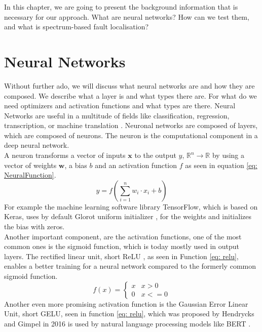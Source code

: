 In this chapter, we are going to present the background information that is necessary for our approach.
What are neural networks?
How can we test them, and what is spectrum-based fault localisation?
\section{Neural Networks}\label{sec:neural-networks}
Without further ado, we will discuss what neural networks are and how they are composed.
We describe what a layer is and what types there are.
For what do we need optimizers and activation functions and what types are there.
Neural Networks are useful in a multitude of fields like classification, regression, transcription, or machine translation \cite{goodfellow_deep_2016}.
Neuronal networks are composed of layers, which are composed of neurons.
The neuron is the computational component in a deep neural network.\\
A neuron transforms a vector of inputs $\mathbf{x}$ to the output $y$, $\mathbb{R}^n \to \mathbb{R}$
by using a vector of weights $\mathbf{w}$, a bias $b$ and an activation function $f$ as seen in equation \ref{eq: NeuralFunction}.
\begin{equation}
    y = f\left( \sum^n_{i=1} w_i\cdot x_i + b\right)
    \label{eq: NeuralFunction}
\end{equation}
For example the machine learning software library TensorFlow, which is based on Keras, uses by default Glorot uniform initializer \cite{noauthor_tfkeraslayersdense_2023,glorot_understanding_2010}, for the weights and initializes the bias with zeros.\\
Another important component, are the activation functions, one of the most common ones is the sigmoid function, which is today mostly used in output layers.
The rectified linear unit, short ReLU \cite{fukushima_cognitron_1975,glorot_deep_2011}, as seen in Function \ref{eq: relu}, enables a better training for a neural network compared to the formerly common sigmoid function.
\begin{equation}
    f(x) =
    \begin{cases}
        x& x > 0\\
        0& x <= 0
    \end{cases}
    \label{eq: relu}
\end{equation}
Another even more promising activation function is the Gaussian Error Linear Unit, short GELU, seen in function \ref{eq: relu}, which was proposed by Hendrycks and Gimpel in 2016 \cite{hendrycks_gaussian_2016} is used by natural language processing models like BERT \cite{devlin_bert_2019}.
